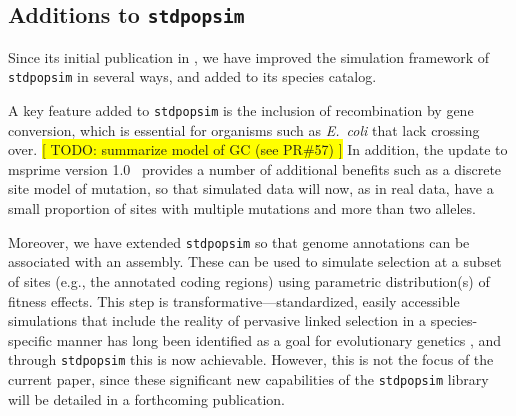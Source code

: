 \documentclass[hidelinks]{article}
\newcommand{\stdpopsim}{\texttt{stdpopsim}\xspace}
\begin{document}


\subsection*{Additions to \stdpopsim}
    \label{sec:expanded-catalog}

Since its initial publication in \cite{Adrion2020},
we have improved the simulation framework of \stdpopsim in several ways,
and added to its species catalog.

A key feature added to \stdpopsim
is the inclusion of recombination by gene conversion,
which is essential for organisms such as \textit{E.\ coli}
that lack crossing over.
\colorbox{yellow}{[ TODO: summarize model of GC (see PR\#57) ]}
In addition, the update to msprime version 1.0~\citep{Baumdicker2022}
provides a number of additional benefits such as a discrete site model of mutation,
so that simulated data will now, as in real data,
have a small proportion of sites with multiple mutations and more than two alleles.

Moreover, we have extended \stdpopsim so that
genome annotations can be associated with an assembly.
These can be used to simulate selection at a subset of sites (e.g., the annotated coding regions)
using parametric distribution(s) of fitness effects.
This step is transformative---standardized, easily accessible simulations
that include the reality of pervasive linked selection in a species-specific
manner has long been identified as a goal for evolutionary genetics
\cite[e.g.,][]{McVicker2009,comeron2014background}, and through \stdpopsim
this is now achievable.
However, this is not the focus of the current paper, since
these significant new capabilities of the \stdpopsim library will be detailed in a forthcoming publication.
\end{document}
